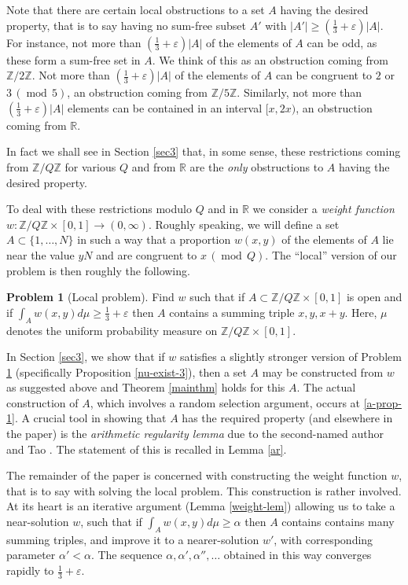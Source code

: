 \documentclass[10pt,reqno]{amsart}
\theoremstyle{definition}
\newtheorem{problem}[theorem]{Problem}
\theoremstyle{remark}
\newcommand{\md}[1]{\ensuremath{\,(\operatorname{mod}\, #1)}}
\renewcommand{\geq}{\geqslant}
\def\R{\mathbb{R}}
\def\Z{\mathbb{Z}}
\def\eps{\varepsilon}
\numberwithin{equation}{section}
\begin{document}
Note that there are certain local obstructions to a set $A$ having the desired property, that is to say having no sum-free subset $A'$ with $|A'| \geq (\frac{1}{3} + \eps)|A|$. For instance, not more than $\left(\tfrac{1}{3} + \eps\right) |A|$ of the elements of $A$ can be odd, as these form a sum-free set in $A$. We think of this as an obstruction coming from $\Z/2\Z$. Not more than $\left(\tfrac{1}{3} + \eps\right)|A|$ of the elements of $A$ can be congruent to $2$ or $3 \md{5}$, an obstruction coming from $\Z/5\Z$. Similarly, not more than $\left(\tfrac{1}{3} + \eps\right) |A|$ elements can be contained in an interval $[x, 2x)$, an obstruction coming from $\R$.

In fact we shall see in Section \ref{sec3} that, in some sense, these restrictions coming from $\Z/Q\Z$ for various $Q$ and from $\R$ are the \emph{only} obstructions to $A$ having the desired property.  

To deal with these restrictions modulo $Q$ and in $\R$ we consider a \emph{weight function} $w : \Z / Q \Z \times [0, 1] \rightarrow (0,\infty)$. Roughly speaking, we will define a set $A \subset \{1,\dots,N\}$ in such a way that a proportion $w(x,y)$ of the elements of $A$ lie near the value $yN$ and are congruent to $x \md{Q}$.  The ``local'' version of our problem is then roughly the following.

\begin{problem}[Local problem]\label{local_problem}
Find $w$ such that if $A \subset \Z / Q \Z \times [0, 1]$ is open and if $\int_A w(x,y) d\mu \geq \frac{1}{3} + \eps$ then $A$ contains a summing triple $x, y, x + y$. Here, $\mu$ denotes the uniform probability measure on $\Z/Q\Z \times [0,1]$.
\end{problem}

In Section \ref{sec3}, we show that if $w$ satisfies a slightly stronger version of Problem \ref{local_problem} (specifically Proposition \ref{nu-exist-3}), then a set $A$ may be constructed from $w$ as suggested above and Theorem \ref{mainthm} holds for this $A$. The actual construction of $A$, which involves a random selection argument, occurs at \eqref{a-prop-1}. A crucial tool in showing that $A$ has the required property (and elsewhere in the paper) is the \emph{arithmetic regularity lemma} due to the second-named author and Tao \cite{green-tao-arithregularity}. The statement of this is recalled in Lemma \ref{ar}.

The remainder of the paper is concerned with constructing the weight function $w$, that is to say with solving the local problem.  This construction is rather involved. At its heart is an iterative argument (Lemma \ref{weight-lem}) allowing us to take a near-solution $w$, such that if $\int_A w(x,y) d\mu \geq \alpha$ then $A$ contains contains many summing triples, and improve it to a nearer-solution $w'$, with corresponding parameter $\alpha'<\alpha$. The sequence $\alpha, \alpha', \alpha'',\dots$ obtained in this way converges rapidly to $\frac{1}{3}+\eps$. 
\end{document}
